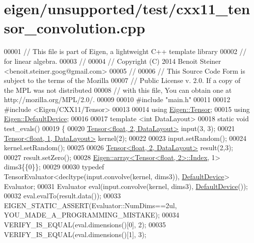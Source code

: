 \hypertarget{eigen_2unsupported_2test_2cxx11__tensor__convolution_8cpp_source}{}\section{eigen/unsupported/test/cxx11\+\_\+tensor\+\_\+convolution.cpp}
\label{eigen_2unsupported_2test_2cxx11__tensor__convolution_8cpp_source}

\begin{DoxyCode}
00001 \textcolor{comment}{// This file is part of Eigen, a lightweight C++ template library}
00002 \textcolor{comment}{// for linear algebra.}
00003 \textcolor{comment}{//}
00004 \textcolor{comment}{// Copyright (C) 2014 Benoit Steiner <benoit.steiner.goog@gmail.com>}
00005 \textcolor{comment}{//}
00006 \textcolor{comment}{// This Source Code Form is subject to the terms of the Mozilla}
00007 \textcolor{comment}{// Public License v. 2.0. If a copy of the MPL was not distributed}
00008 \textcolor{comment}{// with this file, You can obtain one at http://mozilla.org/MPL/2.0/.}
00009 
00010 \textcolor{preprocessor}{#include "main.h"}
00011 
00012 \textcolor{preprocessor}{#include <Eigen/CXX11/Tensor>}
00013 
00014 \textcolor{keyword}{using} \hyperlink{class_eigen_1_1_tensor}{Eigen::Tensor};
00015 \textcolor{keyword}{using} \hyperlink{struct_eigen_1_1_default_device}{Eigen::DefaultDevice};
00016 
00017 \textcolor{keyword}{template} <\textcolor{keywordtype}{int} DataLayout>
00018 \textcolor{keyword}{static} \textcolor{keywordtype}{void} test\_evals()
00019 \{
00020   \hyperlink{class_eigen_1_1_tensor}{Tensor<float, 2, DataLayout>} input(3, 3);
00021   \hyperlink{class_eigen_1_1_tensor}{Tensor<float, 1, DataLayout>} kernel(2);
00022 
00023   input.setRandom();
00024   kernel.setRandom();
00025 
00026   \hyperlink{class_eigen_1_1_tensor}{Tensor<float, 2, DataLayout>} result(2,3);
00027   result.setZero();
00028   \hyperlink{class_eigen_1_1array}{Eigen::array<Tensor<float, 2>::Index}, 1> dims3\{\{0\}\};
00029 
00030   \textcolor{keyword}{typedef} TensorEvaluator<decltype(input.convolve(kernel, dims3)), \hyperlink{struct_eigen_1_1_default_device}{DefaultDevice}> Evaluator;
00031   Evaluator eval(input.convolve(kernel, dims3), \hyperlink{struct_eigen_1_1_default_device}{DefaultDevice}());
00032   eval.evalTo(result.data());
00033   EIGEN\_STATIC\_ASSERT(Evaluator::NumDims==2ul, YOU\_MADE\_A\_PROGRAMMING\_MISTAKE);
00034   VERIFY\_IS\_EQUAL(eval.dimensions()[0], 2);
00035   VERIFY\_IS\_EQUAL(eval.dimensions()[1], 3);

\end{DoxyCode}
